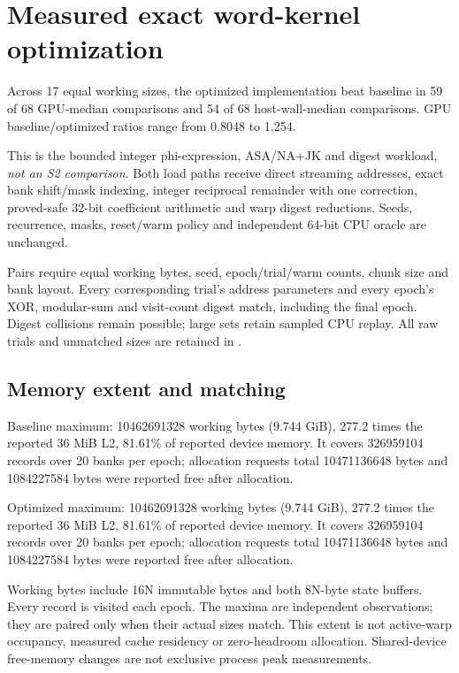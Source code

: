 
\section{Measured exact word-kernel optimization}\label{sec:word-optimization}

Across 17 equal working sizes, the optimized implementation beat baseline in 59 of 68 GPU-median comparisons and 54 of 68 host-wall-median comparisons. GPU baseline/optimized ratios range from 0.8048 to 1.254.

This is the bounded integer phi-expression, ASA/NA+JK and digest workload, \emph{not an S2 comparison}. Both load paths receive direct streaming addresses, exact bank shift/mask indexing, integer reciprocal remainder with one correction, proved-safe 32-bit coefficient arithmetic and warp digest reductions. Seeds, recurrence, masks, reset/warm policy and independent 64-bit CPU oracle are unchanged.

Pairs require equal working bytes, seed, epoch/trial/warm counts, chunk size and bank layout. Every corresponding trial's address parameters and every epoch's XOR, modular-sum and visit-count digest match, including the final epoch. Digest collisions remain possible; large sets retain sampled CPU replay. All raw trials and unmatched sizes are retained in .

\subsection{Memory extent and matching}

Baseline maximum: 10462691328 working bytes (9.744 GiB), 277.2 times the reported 36 MiB L2, 81.61\% of reported device memory. It covers 326959104 records over 20 banks per epoch; allocation requests total 10471136648 bytes and 1084227584 bytes were reported free after allocation.

Optimized maximum: 10462691328 working bytes (9.744 GiB), 277.2 times the reported 36 MiB L2, 81.61\% of reported device memory. It covers 326959104 records over 20 banks per epoch; allocation requests total 10471136648 bytes and 1084227584 bytes were reported free after allocation.

Working bytes include 16N immutable bytes and both 8N-byte state buffers. Every record is visited each epoch. The maxima are independent observations; they are paired only when their actual sizes match. This extent is not active-warp occupancy, measured cache residency or zero-headroom allocation. Shared-device free-memory changes are not exclusive process peak measurements.

